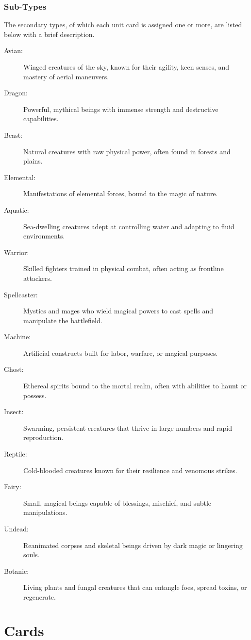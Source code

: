 \subsubsection{Sub-Types}
The secondary types, of which each unit card is assigned one or more, are listed below with a brief description.
\begin{description}
	\item[Avian:] Winged creatures of the sky, known for their agility, keen senses, and mastery of aerial maneuvers.
	\item[Dragon:] Powerful, mythical beings with immense strength and destructive capabilities.
	\item[Beast:] Natural creatures with raw physical power, often found in forests and plains.
	\item[Elemental:] Manifestations of elemental forces, bound to the magic of nature.
	\item[Aquatic:] Sea-dwelling creatures adept at controlling water and adapting to fluid environments.
	\item[Warrior:] Skilled fighters trained in physical combat, often acting as frontline attackers.
	\item[Spellcaster:] Mystics and mages who wield magical powers to cast spells and manipulate the battlefield.
	\item[Machine:] Artificial constructs built for labor, warfare, or magical purposes.
	\item[Ghost:] Ethereal spirits bound to the mortal realm, often with abilities to haunt or possess.
	\item[Insect:] Swarming, persistent creatures that thrive in large numbers and rapid reproduction.
	\item[Reptile:] Cold-blooded creatures known for their resilience and venomous strikes.
	\item[Fairy:] Small, magical beings capable of blessings, mischief, and subtle manipulations.
	\item[Undead:] Reanimated corpses and skeletal beings driven by dark magic or lingering souls.
	\item[Botanic:] Living plants and fungal creatures that can entangle foes, spread toxins, or regenerate.
\end{description}




\section{Cards}

